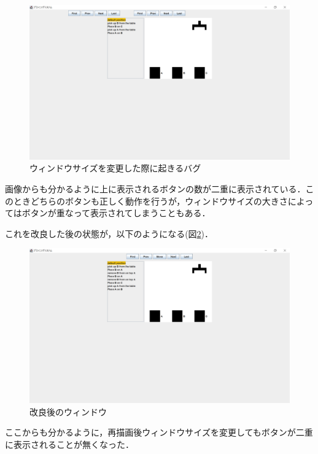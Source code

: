 \documentclass[12pt]{jarticle}
\begin{document}
\begin{figure}[htbp]
  \begin{center}
    \includegraphics[scale=0.4]{images/ButErr.PNG}
    \caption{ウィンドウサイズを変更した際に起きるバグ}
    \label{fig:ButErr}
  \end{center}
\end{figure}
画像からも分かるように上に表示されるボタンの数が二重に表示されている．このときどちらのボタンも正しく動作を行うが，ウィンドウサイズの大きさによってはボタンが重なって表示されてしまうこともある．\\

\clearpage

これを改良した後の状態が，以下のようになる(図\ref{fig:ButOK})．\\

\begin{figure}[htbp]
  \begin{center}
    \includegraphics[scale=0.4]{images/ButOK.PNG}
    \caption{改良後のウィンドウ}
    \label{fig:ButOK}
  \end{center}
\end{figure}
ここからも分かるように，再描画後ウィンドウサイズを変更してもボタンが二重に表示されることが無くなった．\\
\clearpage
\end{document}
